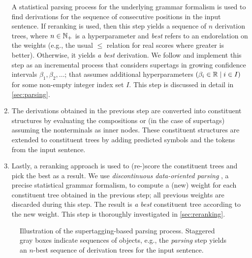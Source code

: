 \documentclass[../document.tex]{subfiles}
\begin{document}
\begin{enumerate}
            A statistical parsing process for the underlying grammar formalism is used to find derivations for the sequence of consecutive positions in the input sentence.
            If reranking is used, then this step yields a sequence of \(n\) derivation trees, where \(n \in \mathbb{N}_+\) is a hyperparameter and \emph{best} refers to an endorelation on the weights (e.g., the usual \(\leq\) relation for real scores where greater is better).
            Otherwise, it yields \emph{a best} derivation.
            We follow \citet{Auli12} and implement this step as an incremental process that considers supertags in growing confidence intervals \(\beta_1, \beta_2, \ldots\); that assumes additional hyperparameters \((\beta_i \in \mathbb{R} \mid i \in I)\) for some non-empty integer index set \(I\).
            This step is discussed in detail in \cref{sec:parsing}.
        \item\label{parsing:item:3}
            The derivations obtained in the previous step are converted into constituent structures by evaluating the  compositions or (in the case of  supertags) assuming the nonterminals as inner nodes.
            These constituent structures are extended to constituent trees by adding predicted  symbols and the tokens from the input sentence.
        \item\label{parsing:item:4}
            Lastly, a reranking approach is used to (re-)score the constituent trees and pick the best as a result.
            We use \emph{discontinuous data-oriented parsing} \citep{CraSchBod16}, a precise statistical grammar formalism, to compute a (new) weight for each constituent tree obtained in the previous step; all previous weights are discarded during this step.
            The result is \emph{a best} constituent tree according to the new weight.
            This step is thoroughly investigated in \cref{sec:reranking}.
    \end{enumerate}

    \begin{figure}
        
        \caption{\label{fig:parsing:overview}
            Illustration of the supertagging-based parsing process.
            Staggered gray boxes indicate sequences of objects, e.g.\@, the \emph{parsing} step yields an \(n\)-best sequence of derivation trees for the input sentence.
        }
    \end{figure}

    
    

    \ifSubfilesClassLoaded{%
        \printindex
    }{}
\end{document}
